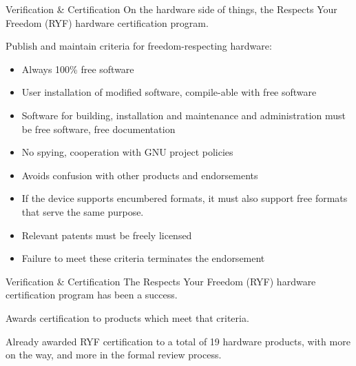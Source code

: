 \documentclass[
  size=12pt,
  style=simple,
  paper=screen
]{powerdot}
\begin{document}
\begin{wideslide}{Verification \& Certification}
  On the hardware side of things, the Respects Your Freedom (RYF)
  hardware certification program.
  \pp

  \begin{itemize}
    \nitem Publish and maintain criteria for freedom-respecting
    hardware:

    \pp

    \begin{itemize}
    \item Always 100\% free software \pp
    \item User installation of modified software, compile-able with free software \pp
    \item Software for building, installation and maintenance and
      administration must be free software, free documentation \pp
    \item No spying, cooperation with GNU project policies \pp
    \item Avoids confusion with other products and endorsements \pp
    \item If the device supports encumbered formats, it must also
      support free formats that serve the same purpose. \pp
    \item Relevant patents must be freely licensed \pp
    \item Failure to meet these criteria terminates the endorsement
    \end{itemize}

  \end{itemize}
\end{wideslide}

\begin{wideslide}{Verification \& Certification}
  The Respects Your Freedom (RYF) hardware certification program has been a success.

  \pp

  \begin{itemize}
    \setlength{\itemsep}{1em}

    \nitem Awards certification to products which meet that criteria.

    \pp

    \nitem Already awarded RYF certification to a total of 19 hardware
    products, with more on the way, and more in the formal review
    process.

  \end{itemize}
\end{wideslide}
\end{document}
